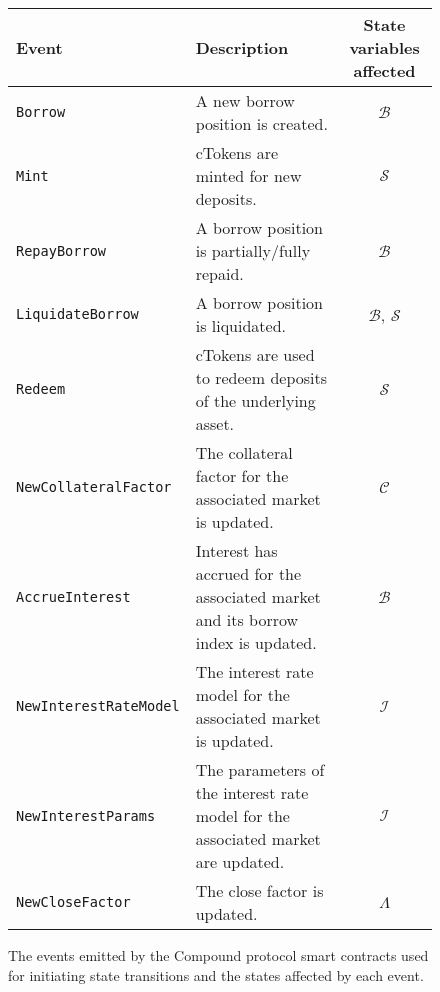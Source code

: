 
\begin{figure}[tb]
  \centering
  \scriptsize
  \setlength{\tabcolsep}{1.5pt}
  \begin{tabular}{lp{6cm}c}
    \toprule
    {\bf Event} & {\bf Description} &
    {\bf State variables affected}\\

    \midrule
    \texttt{Borrow}  & A new borrow position is created. & $\mathcal{B}$  \\ 
    \texttt{Mint} & cTokens are minted for new deposits. &  $\mathcal{S}$           \\
    \texttt{RepayBorrow} & A borrow position is partially/fully repaid.& $\mathcal{B}$            \\ 
    \texttt{LiquidateBorrow} & A borrow position is liquidated. & $\mathcal{B}$, $\mathcal{S}$             \\
    \texttt{Redeem} & cTokens are used to redeem deposits of the underlying asset. & $\mathcal{S}$ \\
    \texttt{NewCollateralFactor} & The collateral factor for the associated market is updated. & $\mathcal{C}$   \\
    \texttt{AccrueInterest} & Interest has accrued for the associated market and its borrow index is updated. & $\mathcal{B}$            \\
    \texttt{NewInterestRateModel} & The interest rate model for the associated market is updated. & $\mathcal{I}$             \\
    \texttt{NewInterestParams} & The parameters of the interest rate model for the associated market are updated. & $\mathcal{I}$            \\
    \texttt{NewCloseFactor} & The close factor is updated. &     $\Lambda$   \\
    \bottomrule
  \end{tabular}
  \caption{The events emitted by the Compound protocol smart contracts used for initiating state transitions and the states affected by each event.}
\label{tab:compound-events}
\end{figure}
